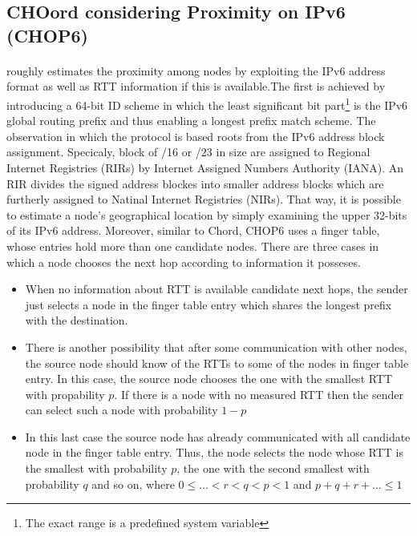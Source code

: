 \documentclass[a4paper,10pt]{article}
\begin{document}
\subsection{CHOord considering Proximity on IPv6 (CHOP6)}

\paragraph{}
\cite{morimoto_chop6_2007} roughly estimates the proximity among nodes by exploiting the IPv6 address format as well as RTT information if this is available.The first is achieved by introducing a 64-bit ID scheme in which the least significant bit part\footnote{The exact range is a predefined system variable} is the IPv6 global routing prefix and thus enabling a longest prefix match scheme. The observation in which the protocol is based roots from the IPv6 address block assignment. Specicaly, block of /16 or /23 in size are assigned to Regional Internet Registries (RIRs) by Internet Assigned Numbers Authority (IANA). An RIR divides the signed address blockes into smaller address blocks which are furtherly assigned to Natinal Internet Registries (NIRs). That way, it is possible to estimate a node's geographical location by simply examining the upper 32-bits of its IPv6 address. Moreover, similar to Chord, CHOP6 uses a finger table, whose entries hold more than one candidate nodes. There are three cases in which a node chooses the next hop according to information it posseses.
\begin{itemize}
 \item When no information about RTT is available candidate next hops, the sender just selects a node in the finger table entry which shares the longest prefix with the destination.
 \item There is another possibility that after some communication with other nodes, the source node should know of the RTTs to some of the nodes in finger table entry. In this case, the source node chooses the one with the smallest RTT with propability $p$. If there is a node with no measured RTT then the sender can select such a node with probability $1 - p$
 \item In this last case the source node has already communicated with all candidate node in the finger table entry. Thus, the node selects the node whose RTT is the smallest with probability $p$, the one with the second smallest with probability $q$ and so on, where $0 \leq \ldots < r < q < p < 1$ and $p+q+r+\ldots \leq 1$
\end{itemize}
\end{document}

